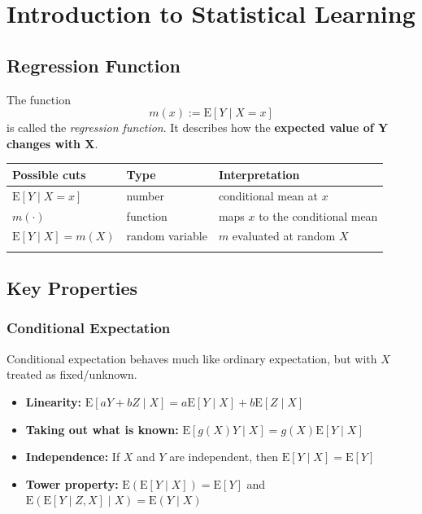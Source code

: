 \chapter{Introduction to Statistical Learning}
\label{ch:topic1}

\section{Regression Function}
The function
\[
m(x):= \text{E}[Y \mid X = x]
\]
is called the \textit{regression function}. It describes how the \textbf{expected value of Y changes with X}.

\begin{table}[h]
\begin{tabular}{@{}l p{3cm} l@{}}
\toprule
Possible cuts & Type & Interpretation\\
\midrule
$\text{E}[Y \mid X = x]$ & number & conditional mean at $x$\\
$m(\cdot)$ & function & maps $x$ to the conditional mean\\
$\text{E}[Y\mid X] = m(X)$ & random variable & $m$ evaluated at random $X$\\
\botrule
\end{tabular}
\end{table}

\section{Key Properties}
\subsection{Conditional Expectation}
Conditional expectation behaves much like ordinary expectation, but with $X$ treated as fixed/unknown.

\begin{itemize}
    \item \textbf{Linearity: } $\text{E}[aY + bZ \mid X]=a\text{E}[Y \mid X]+b\text{E}[Z \mid X]$
    \item \textbf{Taking out what is known: } $\text{E}[g(X)Y \mid X] = g(X)\text{E}[Y \mid X]$
    \item \textbf{Independence:} If $X$ and $Y$ are independent, then $\text{E}[Y \mid X] = \text{E}[Y]$
    \item \textbf{Tower property:} $\text{E}(\text{E}[Y \mid X])=\text{E}[Y]$ and $\text{E}(\text{E}[Y \mid Z, X] \mid X) =\text{E}(Y \mid X)$
\end{itemize}

